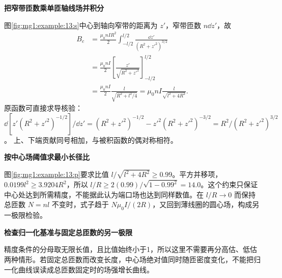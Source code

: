 \begin{solution}\textbf{把窄带匝数乘单匝轴线场并积分}\par\nobreak
图\ref{fig:mg1:example:13:s}中心到轴向窄带的距离为 $z'$，窄带匝数 $n\dd z'$，故
\begin{align*}
B_c&=\frac{\mu_0nIR^2}{2}\int_{-l/2}^{l/2}\frac{\dd z'}{(R^2+z'^2)^{3/2}}\\
&=\frac{\mu_0nI}{2}
 \left[\frac{z'}{\sqrt{R^2+z'^2}}\right]_{-l/2}^{l/2}\\
&=\frac{\mu_0nI}{2}\frac{l}{\sqrt{R^2+l^2/4}}
=\mu_0nI\frac{l}{\sqrt{l^2+4R^2}}.
\end{align*}
原函数可直接求导核验：
$\dd[z'(R^2+z'^2)^{-1/2}]/\dd z'
=(R^2+z'^2)^{-1/2}-z'^2(R^2+z'^2)^{-3/2}
=R^2/(R^2+z'^2)^{3/2}$。
上、下端贡献同号相加，与被积函数的偶对称相符。



\par\medskip{}\noindent\textbf{按中心场阈值求最小长径比}\par\nobreak
图\ref{fig:mg1:example:13:p}要求比值 $l/\sqrt{l^2+4R^2}\ge0.99$。平方并移项，$0.0199l^2\ge3.9204R^2$，所以 $l/R\ge2(0.99)/\sqrt{1-0.99^2}=14.0$。这个约束只保证中心处达到所需精度，不能据此认为端口场也达到同样数值。在 $l/R\to0$ 而保持总匝数 $N=nl$ 不变时，式子趋于 $N\mu_0I/(2R)$，又回到薄线圈的圆心场，构成另一极限检验。



\par\medskip{}\noindent\textbf{检查归一化基准与固定总匝数的另一极限}\par\nobreak
精度条件的分母取无限长值，且比值始终小于1，所以这里不需要再分高估、低估两种情形。若固定总匝数而改变长度，中心场绝对值同时随匝密度变化，不能把归一化曲线误读成总匝数固定时的场强增长曲线。\end{solution}
